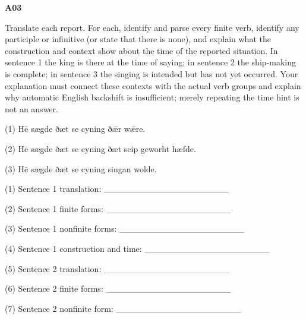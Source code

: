 \par\begin{minipage}{\linewidth}\raggedright
\textbf{A03}

Translate each report. For each, identify and parse every finite verb, identify any participle or infinitive (or state that there is none), and explain what the construction and context show about the time of the reported situation. In sentence 1 the king is there at the time of saying; in sentence 2 the ship-making is complete; in sentence 3 the singing is intended but has not yet occurred. Your explanation must connect these contexts with the actual verb groups and explain why automatic English backshift is insufficient; merely repeating the time hint is not an answer.

(1) Hē sægde ðæt se cyning ðǣr wǣre.

(2) Hē sægde ðæt se cyning ðæt scip geworht hæfde.

(3) Hē sægde ðæt se cyning singan wolde.

(1) Sentence 1 translation: \_\_\_\_\_\_\_\_\_\_\_\_\_\_\_\_\_\_\_\_

(2) Sentence 1 finite forms: \_\_\_\_\_\_\_\_\_\_\_\_\_\_\_\_\_\_\_\_

(3) Sentence 1 nonfinite forms: \_\_\_\_\_\_\_\_\_\_\_\_\_\_\_\_\_\_\_\_

(4) Sentence 1 construction and time: \_\_\_\_\_\_\_\_\_\_\_\_\_\_\_\_\_\_\_\_

(5) Sentence 2 translation: \_\_\_\_\_\_\_\_\_\_\_\_\_\_\_\_\_\_\_\_

(6) Sentence 2 finite forms: \_\_\_\_\_\_\_\_\_\_\_\_\_\_\_\_\_\_\_\_

(7) Sentence 2 nonfinite form: \_\_\_\_\_\_\_\_\_\_\_\_\_\_\_\_\_\_\_\_


\end{minipage}
